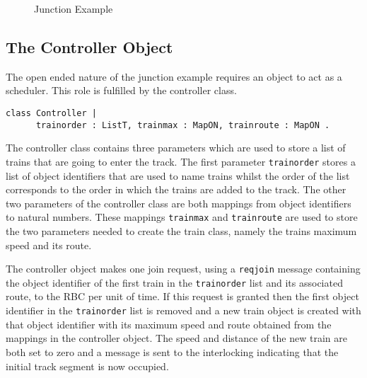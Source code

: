 \begin{figure}[h!]
\begin{center}
\end{center} 
\caption{Junction Example}
\label{fig:junctionexample}
\end{figure}

\subsection*{The Controller Object}
The open ended nature of the junction example requires an object to act as a scheduler. This role is fulfilled by the controller class. 

\begin{lstlisting}[caption = "Controller Class"]
class Controller | 
      trainorder : ListT, trainmax : MapON, trainroute : MapON .
\end{lstlisting}

The controller class contains three parameters which are used to store a list of trains that are going to enter the track. The first parameter \texttt{trainorder} stores a list of object identifiers that are used to name trains whilst the order of the list corresponds to the order in which the trains are added to the track. The other two parameters of the controller class are both mappings from object identifiers to natural numbers. These mappings \texttt{trainmax} and \texttt{trainroute} are used to store the two parameters needed to create the train class, namely the trains maximum speed and its route.

The controller object makes one join request, using a \texttt{reqjoin} message containing the object identifier of the first train in the \texttt{trainorder} list and its associated route, to the RBC per unit of time. If this request is granted then the first object identifier in the \texttt{trainorder} list is removed and a new train object is created with that object identifier with its maximum speed and route obtained from the mappings in the controller object. The speed and distance of the new train are both set to zero and a message is sent to the interlocking indicating that the initial track segment is now occupied. 

